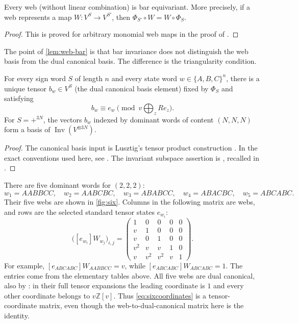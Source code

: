 \documentclass[a4paper,11pt]{amsart}
\newcommand{\Z}{\mathbb Z}
\newcommand{\Inv}{\operatorname{Inv}}
\newcommand{\word}[1]{#1}
\newcommand{\tpar}{v}
\numberwithin{equation}{subsection}
\theoremstyle{plain}
\theoremstyle{definition}
\theoremstyle{remark}
\begin{document}
\begin{lemma}\label{lem:web-bar}
Every web (without linear combination) is bar equivariant. More precisely, if a web represents
a map
$W\colon V^S\longrightarrow V^{S'}$,
then
$\Phi_{S'}\circ W=W\circ\Phi_S$.
\end{lemma}

\begin{proof}
This is proved for arbitrary monomial web maps in the proof of
\cite[Proposition 2]{KK}.
\end{proof}

The point of \autoref{lem:web-bar} is that bar invariance does not
distinguish the web basis from the dual canonical basis. The difference
is the triangularity condition.

\begin{proposition}\label{thm:canonical}
For every sign word $S$ of length $n$ and every state word
$w\in\{A,B,C\}^n$, there is a unique tensor $b_w\in V^S$
(the dual canonical basis element) fixed by $\Phi_S$ and satisfying
\[
b_w\equiv e_w\pmod{\tpar\bigoplus_z R e_z}.
\]
For $S=+^{3N}$, the vectors $b_w$ indexed by dominant words of
content $(N,N,N)$ form a basis of $\Inv(V^{\otimes3N})$.
\end{proposition}

\begin{proof}
The canonical basis input is Lusztig's tensor product construction
\cite[Chapter 27]{Lusztig}.
In the exact conventions used here, see
\cite[Theorem 3]{KK}. The invariant subspace assertion is
\cite[Section 27.2.5]{Lusztig}, recalled in \cite[Section 6]{KK}.
\end{proof}

\begin{example}\label{ex:six}
There are five dominant words for $(2,2,2)$:
\[
w_1=\word{AABBCC},\quad w_2=\word{AABCBC},\quad
w_3=\word{ABABCC},\quad w_4=\word{ABACBC},\quad w_5=\word{ABCABC}.
\]
Their five webs are shown in \autoref{fig:six}. Columns in the following
matrix are webs, and rows are the selected standard tensor states $e_{w_i}$:
\begin{equation}\label{eq:sixcoordinates}
\bigl([e_{w_i}]W_{w_j}\bigr)_{i,j}=
\begin{pmatrix}
1&0&0&0&0\\
\tpar&1&0&0&0\\
\tpar&0&1&0&0\\
\tpar^2&\tpar&\tpar&1&0\\
\tpar&\tpar^2&\tpar^2&\tpar&1
\end{pmatrix}.
\end{equation}
For example, $[e_{ABCABC}]W_{AABBCC}=\tpar$, while
$[e_{ABCABC}]W_{ABCABC}=1$. The entries come from the elementary
tables above. All five webs are dual canonical, also by \cite[Theorem 1]{KK}:
in their full tensor
expansions the leading coordinate is $1$ and every other coordinate
belongs to $\tpar\Z[\tpar]$. Thus \autoref{eq:sixcoordinates} is a tensor-coordinate
matrix, even though the web-to-dual-canonical matrix here is the identity.
\end{example}
\end{document}
